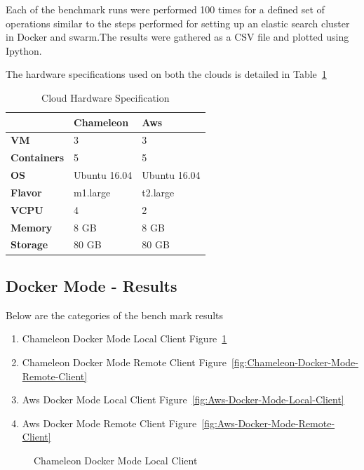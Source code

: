\documentclass[9pt,twocolumn,twoside]{../../styles/osajnl}
\begin{document}
Each of the benchmark runs were performed 100 times for a defined set of operations similar to the steps performed for setting up an elastic search cluster in Docker and swarm.The results were gathered as a CSV file and plotted using Ipython\cite{www-ipython}.

The hardware specifications used on both the clouds is detailed in Table~\ref{tab:dockerhardware}
\begin{table}[h]
\centering
\caption{Cloud Hardware Specification }
\label{tab:dockerhardware}
\begin{tabular}{|l|l|l|}
\hline
 & \textbf{Chameleon} & \textbf{Aws} \\ \hline
\textbf{VM} & 3 & 3 \\
\textbf{Containers} & 5 & 5 \\
\textbf{OS} & Ubuntu 16.04 & Ubuntu 16.04 \\
\textbf{Flavor} & m1.large & t2.large \\
\textbf{VCPU} & 4 & 2 \\
\textbf{Memory} & 8 GB & 8 GB \\
\textbf{Storage} & 80 GB & 80 GB\\
\hline
\end{tabular}
\end{table}

\subsection{Docker Mode - Results}

Below are the categories of the bench mark results
\begin{enumerate}
\item Chameleon Docker Mode Local Client Figure~\ref{fig:Chameleon-Docker-Mode-Local-Client}
\item Chameleon Docker Mode Remote Client Figure~\ref{fig:Chameleon-Docker-Mode-Remote-Client}
\item Aws Docker Mode Local Client Figure~\ref{fig:Aws-Docker-Mode-Local-Client}
\item Aws Docker Mode Remote Client Figure~\ref{fig:Aws-Docker-Mode-Remote-Client}
\end{enumerate}


\begin{figure}[ht]
\centering
{}
\caption{Chameleon Docker Mode Local Client}
\label{fig:Chameleon-Docker-Mode-Local-Client}
\end{figure}
\end{document}
